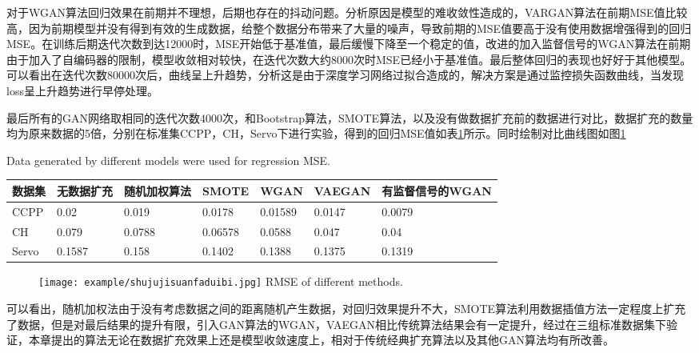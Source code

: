 对于WGAN算法回归效果在前期并不理想，后期也存在的抖动问题。分析原因是模型的难收敛性造成的，VARGAN算法在前期MSE值比较高，因为前期模型并没有得到有效的生成数据，给整个数据分布带来了大量的噪声，导致前期的MSE值要高于没有使用数据增强得到的回归MSE。在训练后期迭代次数到达12000时，MSE开始低于基准值，最后缓慢下降至一个稳定的值，改进的加入监督信号的WGAN算法在前期由于加入了自编码器的限制，模型收敛相对较快，在迭代次数大约8000次时MSE已经小于基准值。最后整体回归的表现也好好于其他模型。可以看出在迭代次数80000次后，曲线呈上升趋势，分析这是由于深度学习网络过拟合造成的，解决方案是通过监控损失函数曲线，当发现loss呈上升趋势进行早停处理。

最后所有的GAN网络取相同的迭代次数4000次，和Bootstrap算法，SMOTE算法，以及没有做数据扩充前的数据进行对比，数据扩充的数量均为原来数据的5倍，分别在标准集CCPP，CH，Servo下进行实验，得到的回归MSE值如表\ref{tabMSE}所示。同时绘制对比曲线图如图\ref{tabMSE}


\begin{table}[htpb]
	\centering
	{Data generated by different models were used for regression MSE.}
	\label{tabMSE}
	\begin{tabular}{lllllll} \toprule
		数据集 & 无数据扩充 & 随机加权算法&SMOTE&WGAN&VAEGAN&有监督信号的WGAN \\  \midrule
		CCPP&0.02&0.019&0.0178&0.01589&0.0147&0.0079\\
		CH&0.079&0.0788&0.06578&0.0588&0.047&0.04\\
		Servo&0.1587&0.158&0.1402&0.1388&0.1375&0.1319\\
		 \bottomrule
	\end{tabular}
\end{table}



\begin{figure}[htpb]
	\centering
	\texttt{[image: example/shujujisuanfaduibi.jpg]}
	{RMSE of different methods.}
	\label{fig:MSE}
\end{figure}

可以看出，随机加权法由于没有考虑数据之间的距离随机产生数据，对回归效果提升不大，SMOTE算法利用数据插值方法一定程度上扩充了数据，但是对最后结果的提升有限，引入GAN算法的WGAN，VAEGAN相比传统算法结果会有一定提升，经过在三组标准数据集下验证，本章提出的算法无论在数据扩充效果上还是模型收敛速度上，相对于传统经典扩充算法以及其他GAN算法均有所改善。


